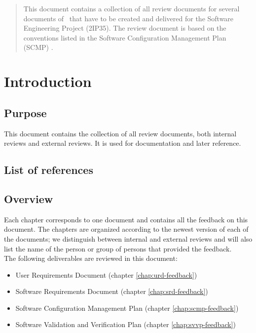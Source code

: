 \documentclass[%
		pathtobase=..,%
		titlefull={Review Document},%
		titleabbr=Review,%
		version=0.6]{fingerpaint}
\begin{document}
\maketitle{}

\begin{abstract}
This document contains a collection of all review documents for several documents of \projectname\ that have to be created and delivered for the Software Engineering Project (2IP35). The review document is based on the conventions listed in the Software Configuration Management Plan (SCMP) \cite{scmp}.
\end{abstract}

\tableofcontents



\chapter{Introduction}
\section{Purpose}
This document contains the collection of all review documents, both internal reviews and external reviews. It is used for documentation and later reference.

\section{List of references}


\section{Overview}
Each chapter corresponds to one document and contains all the feedback on this document. The chapters are organized according to the newest version of each of the documents; we distinguish between internal and external reviews and will also list the name of the person or group of persons that provided the feedback. \\
The following deliverables are reviewed in this document:
\begin{itemize}
\item User Requirements Document \cite{urd} (chapter \ref{chap:urd-feedback})
\item Software Requirements Document \cite{srd} (chapter \ref{chap:srd-feedback})
\item Software Configuration Management Plan \cite{scmp} (chapter \ref{chap:scmp-feedback})
\item Software Validation and Verification Plan \cite{svvp} (chapter \ref{chap:svvp-feedback})
\end{itemize}






\end{document}
